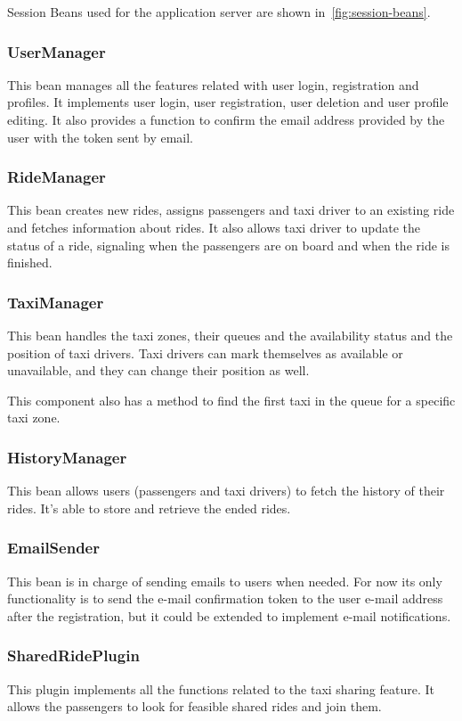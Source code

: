 Session Beans used for the application server are shown in~\autoref{fig:session-beans}.

\subsubsection{UserManager}
This bean manages all the features related with user login, registration and profiles.
It implements user login, user registration, user deletion and user profile editing.
It also provides a function to confirm the email address provided by the user with the token sent by email.

\subsubsection{RideManager}
This bean creates new rides, assigns passengers and taxi driver to an existing ride and fetches information about rides.
It also allows taxi driver to update the status of a ride, signaling when the passengers are on board and when the ride is finished.

\subsubsection{TaxiManager}
This bean handles the taxi zones, their queues and the availability status and the position of taxi drivers.
Taxi drivers can mark themselves as available or unavailable, and they can change their position as well.

This component also has a method to find the first taxi in the queue for a specific taxi zone.

\subsubsection{HistoryManager}
This bean allows users (passengers and taxi drivers) to fetch the history of their rides.
It's able to store and retrieve the ended rides.

\subsubsection{EmailSender}
This bean is in charge of sending emails to users when needed. For now its only functionality is to send the e-mail confirmation token to the user e-mail address after the registration, but it could be extended to implement e-mail notifications.

\subsubsection{SharedRidePlugin}
This plugin implements all the functions related to the taxi sharing feature.
It allows the passengers to look for feasible shared rides and join them.

